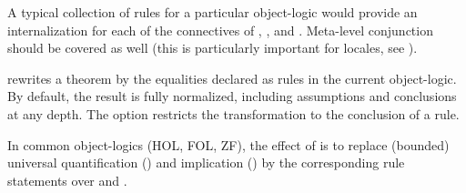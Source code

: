 \begin{isabellebody}
\begin{isamarkuptext}
\begin{descr}
  A typical collection of \mbox{} rules for a particular
  object-logic would provide an internalization for each of the
  connectives of \isa{{\isasymAnd}}, \isa{{\isasymLongrightarrow}}, and \isa{{\isasymequiv}}.
  Meta-level conjunction should be covered as well (this is
  particularly important for locales, see ).

  \item [\mbox{\isa{rule{\isacharunderscore}format}}] rewrites a theorem by the
  equalities declared as \mbox{} rules in the current
  object-logic.  By default, the result is fully normalized, including
  assumptions and conclusions at any depth.  The 
  option restricts the transformation to the conclusion of a rule.

  In common object-logics (HOL, FOL, ZF), the effect of \mbox{} is to replace (bounded) universal quantification
  (\isa{{\isasymforall}}) and implication (\isa{{\isasymlongrightarrow}}) by the corresponding
  rule statements over \isa{{\isasymAnd}} and \isa{{\isasymLongrightarrow}}.

  \end{descr}%
\end{isamarkuptext}%
\isamarkuptrue%
%
\isadelimtheory
%
\endisadelimtheory
%
\isatagtheory
{}\isamarkupfalse%
%
\endisatagtheory
{\isafoldtheory}%
%
\isadelimtheory
%
\endisadelimtheory
\isanewline
\end{isabellebody}%
